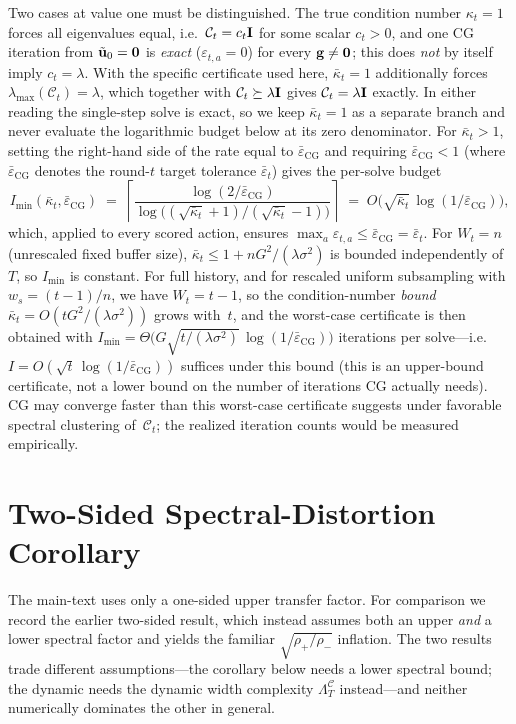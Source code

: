 \documentclass[twoside]{article}
\newcommand{\epsCGbar}{\bar\varepsilon_{\mathrm{CG}}}
\newcommand{\Calg}{\mathcal{C}}                 %
\newcommand{\Lamalg}{\Lambda^{\Calg}}           %
\begin{document}
Two cases at value one must be distinguished.  The true condition number
$\kappa_t=1$ forces all eigenvalues equal, i.e.\ $\Calg_t=c_t\bI$ for some
scalar $c_t>0$, and one CG iteration from $\tilde{\mathbf{u}}_0=\mathbf0$ is \emph{exact}
($\varepsilon_{t,a}=0$) for every $\mathbf{g}\ne\mathbf0$; this does \emph{not} by itself
imply $c_t=\lambda$.  With the specific certificate used here,
$\bar\kappa_t=1$
additionally forces $\lambda_{\max}(\Calg_t)=\lambda$, which together with
$\Calg_t\succeq\lambda\bI$ gives $\Calg_t=\lambda\bI$ exactly.  In either reading
the single-step solve is exact, so we keep $\bar\kappa_t=1$ as a separate branch and
never evaluate the logarithmic budget below at its zero denominator.  For
$\bar\kappa_t>1$, setting the
right-hand side of the rate equal to $\epsCGbar$ and requiring
$\epsCGbar < 1$ (where $\epsCGbar$ denotes the round-$t$ target tolerance
$\bar\varepsilon_t$) gives the per-solve budget
\begin{equation}\label{eq:cg-budget}
  I_{\min}(\bar\kappa_t,\epsCGbar)
  \;=\;
  \left\lceil\frac{\log(2/\epsCGbar)}
  {\log\!\bigl((\sqrt{\bar\kappa_t}+1)/(\sqrt{\bar\kappa_t}-1)\bigr)}
  \right\rceil
  \;=\; O\!\bigl(\sqrt{\bar\kappa_t}\,\log(1/\epsCGbar)\bigr),
\end{equation}
which, applied to every scored action, ensures
$\max_a\varepsilon_{t,a}\le\epsCGbar=\bar\varepsilon_t$.
For $W_t=n$ (unrescaled fixed buffer size),
$\bar\kappa_t\le 1+nG^2/(\lambda\sigma^2)$ is bounded independently of~$T$,
so $I_{\min}$ is constant.
For full history, and for rescaled uniform subsampling with
$w_s=(t{-}1)/n$, we have $W_t=t{-}1$, so the condition-number \emph{bound}
$\bar\kappa_t=O(tG^2/(\lambda\sigma^2))$ grows with~$t$, and the worst-case
certificate is then obtained with
$I_{\min}=\Theta\!\bigl(G\sqrt{t/(\lambda\sigma^2)}\,\log(1/\epsCGbar)\bigr)$
iterations per solve---i.e.\ $I=O(\sqrt{t}\,\log(1/\epsCGbar))$ suffices under this
bound (this is an upper-bound certificate, not a lower bound on the number of
iterations CG actually needs).
CG may converge faster than this worst-case certificate suggests under favorable
spectral clustering of~$\Calg_t$; the realized iteration counts would be measured empirically.

\section{Two-Sided Spectral-Distortion Corollary}\label{app:cor}

The main-text  uses only a one-sided upper
transfer factor.  For comparison we record the earlier two-sided result,
which instead assumes both an upper \emph{and} a lower spectral factor and
yields the familiar $\sqrt{\rho_+/\rho_-}$ inflation.  The two results trade
different assumptions---the corollary below needs a lower spectral bound;
the dynamic  needs the dynamic width complexity
$\Lamalg_T$ instead---and neither numerically dominates the other in
general.
\end{document}
